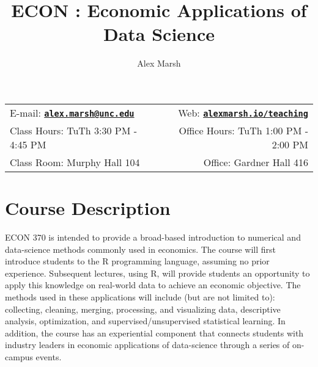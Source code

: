 \documentclass[11pt]{article}
\title{ECON \CourseNum: Economic Applications of Data Science} %
\author{Alex Marsh}                                            %
\date{\SemSeason \SemYear}                                     %
\newcommand{\CourseNum}{370\xspace}         %
\begin{document}
\maketitle

\begin{tabular*}{\textwidth}{@{\extracolsep{\fill}}lr}

E-mail: \href{mailto:alex.marsh@unc.edu}{\tt\bf alex.marsh@unc.edu} & Web: \href{https://alexmarsh.io/teaching}{\tt\bf alexmarsh.io/teaching}\\

Class Hours: TuTh 3:30 PM - 4:45 PM & Office Hours: TuTh 1:00 PM - 2:00 PM \\

Class Room: Murphy Hall 104 & Office: Gardner Hall 416 \\
\hline
\end{tabular*}
\vspace{2 mm}

\section*{Course Description}
ECON \CourseNum is intended to provide a broad-based introduction to numerical and data-science methods commonly used in economics. The course will first introduce students to the R programming language, assuming no prior experience. Subsequent lectures, using R, will provide students an opportunity to apply this knowledge on real-world data to achieve an economic objective.  The methods used in these applications will include (but are not limited to): collecting, cleaning, merging, processing, and visualizing data, descriptive analysis, optimization, and supervised/unsupervised statistical learning. In addition, the course has an experiential component that connects students with industry leaders in economic applications of data-science through a series of on-campus events.


\end{document}
